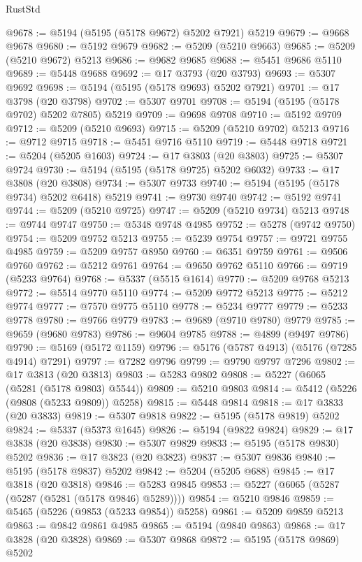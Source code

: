 \begin{lexlean}{RustStd}
\begin{coremodule}
@9678 := @5194 (@5195 (@5178 @9672) @5202 @7921) @5219
@9679 := @9668 @9678
@9680 := @5192 @9679
@9682 := @5209 (@5210 @9663)
@9685 := @5209 (@5210 @9672) @5213
@9686 := @9682 @9685
@9688 := @5451 @9686 @5110
@9689 := @5448 @9688
@9692 := @17 @3793 (@20 @3793)
@9693 := @5307 @9692
@9698 := @5194 (@5195 (@5178 @9693) @5202 @7921)
@9701 := @17 @3798 (@20 @3798)
@9702 := @5307 @9701
@9708 := @5194 (@5195 (@5178 @9702) @5202 @7805) @5219
@9709 := @9698 @9708
@9710 := @5192 @9709
@9712 := @5209 (@5210 @9693)
@9715 := @5209 (@5210 @9702) @5213
@9716 := @9712 @9715
@9718 := @5451 @9716 @5110
@9719 := @5448 @9718
@9721 := @5204 (@5205 @1603)
@9724 := @17 @3803 (@20 @3803)
@9725 := @5307 @9724
@9730 := @5194 (@5195 (@5178 @9725) @5202 @6032)
@9733 := @17 @3808 (@20 @3808)
@9734 := @5307 @9733
@9740 := @5194 (@5195 (@5178 @9734) @5202 @6418) @5219
@9741 := @9730 @9740
@9742 := @5192 @9741
@9744 := @5209 (@5210 @9725)
@9747 := @5209 (@5210 @9734) @5213
@9748 := @9744 @9747
@9750 := @5348 @9748 @4985
@9752 := @5278 (@9742 @9750)
@9754 := @5209 @9752 @5213
@9755 := @5239 @9754
@9757 := @9721 @9755 @4985
@9759 := @5209 @9757 @8950
@9760 := @6351 @9759
@9761 := @9506 @9760
@9762 := @5212 @9761
@9764 := @9650 @9762 @5110
@9766 := @9719 (@5233 @9764)
@9768 := @5337 (@5515 @1614)
@9770 := @5209 @9768 @5213
@9772 := @5514 @9770 @5110
@9774 := @5209 @9772 @5213
@9775 := @5212 @9774
@9777 := @7570 @9775 @5110
@9778 := @5234 @9777
@9779 := @5233 @9778
@9780 := @9766 @9779
@9783 := @9689 (@9710 @9780) @9779
@9785 := @9659 (@9680 @9783)
@9786 := @9604 @9785
@9788 := @4899 (@9497 @9786)
@9790 := @5169 (@5172 @1159)
@9796 := @5176 (@5787 @4913) (@5176 (@7285 @4914) @7291)
@9797 := @7282 @9796
@9799 := @9790 @9797 @7296
@9802 := @17 @3813 (@20 @3813)
@9803 := @5283 @9802
@9808 := @5227 (@6065 (@5281 (@5178 @9803) @5544))
@9809 := @5210 @9803
@9814 := @5412 (@5226 (@9808 (@5233 @9809)) @5258)
@9815 := @5448 @9814
@9818 := @17 @3833 (@20 @3833)
@9819 := @5307 @9818
@9822 := @5195 (@5178 @9819) @5202
@9824 := @5337 (@5373 @1645)
@9826 := @5194 (@9822 @9824)
@9829 := @17 @3838 (@20 @3838)
@9830 := @5307 @9829
@9833 := @5195 (@5178 @9830) @5202
@9836 := @17 @3823 (@20 @3823)
@9837 := @5307 @9836
@9840 := @5195 (@5178 @9837) @5202
@9842 := @5204 (@5205 @688)
@9845 := @17 @3818 (@20 @3818)
@9846 := @5283 @9845
@9853 := @5227 (@6065 (@5287 (@5287 (@5281 (@5178 @9846) @5289))))
@9854 := @5210 @9846
@9859 := @5465 (@5226 (@9853 (@5233 @9854)) @5258)
@9861 := @5209 @9859 @5213
@9863 := @9842 @9861 @4985
@9865 := @5194 (@9840 @9863)
@9868 := @17 @3828 (@20 @3828)
@9869 := @5307 @9868
@9872 := @5195 (@5178 @9869) @5202

\end{coremodule}
\end{lexlean}
